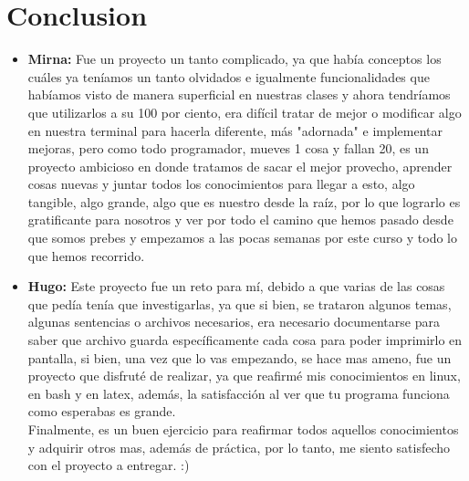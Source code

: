 \documentclass[letterpaper,12pt]{article} %
\begin{document}
\clearpage

\section{Conclusion}

\begin{itemize}
    \item \textbf{Mirna:} Fue un proyecto un tanto complicado, ya que había conceptos los cuáles ya teníamos un tanto olvidados e igualmente funcionalidades que habíamos visto de manera superficial en nuestras clases y ahora tendríamos que utilizarlos a su 100 por ciento, era difícil tratar de mejor o modificar algo en nuestra terminal para hacerla diferente, más "adornada" e implementar mejoras, pero como todo programador, mueves 1 cosa y fallan 20, es un proyecto ambicioso en donde tratamos de sacar el mejor provecho, aprender cosas nuevas y juntar todos los conocimientos para llegar a esto, algo tangible, algo grande, algo que es nuestro desde la raíz, por lo que lograrlo es gratificante para nosotros y ver por todo el camino que hemos pasado desde que somos prebes y empezamos a las pocas semanas por este curso y todo lo que hemos recorrido. 
    
    \item \textbf{Hugo:} Este proyecto fue un reto para mí, debido a que varias de las cosas que pedía tenía que investigarlas, ya que si bien, se trataron algunos temas, algunas sentencias o archivos necesarios, era necesario documentarse para saber que archivo guarda específicamente cada cosa para poder imprimirlo en pantalla, si bien, una vez que lo vas empezando, se hace mas ameno, fue un proyecto que disfruté de realizar, ya que reafirmé mis conocimientos en linux, en bash y en latex, además, la satisfacción al ver que tu programa funciona como esperabas es grande. \\
    Finalmente, es un buen ejercicio para reafirmar todos aquellos conocimientos y adquirir otros mas, además de práctica, por lo tanto, me siento satisfecho con el proyecto a entregar. :)

\centering\vspace*{\fill} 
    
\end{itemize}
\end{document}
